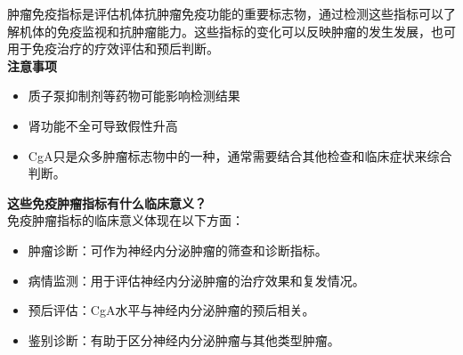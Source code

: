 \documentclass[UTF8]{ctexart}
\begin{document}
\vspace{0.05cm}

\begin{tcolorbox}[
    enhanced,
    colback=customTealBg,
    colframe=customTealBg,
    arc=3mm,
    boxrule=0pt,
    width=\textwidth,
    top=8pt,
    bottom=8pt
]
{\small{\color{customTeal}\faInfoCircle} 肿瘤免疫指标是评估机体抗肿瘤免疫功能的重要标志物，通过检测这些指标可以了解机体的免疫监视和抗肿瘤能力。这些指标的变化可以反映肿瘤的发生发展，也可用于免疫治疗的疗效评估和预后判断。\\

{\color{orange}\faExclamationTriangle} \textbf{注意事项}
\begin{itemize}[]
\item 质子泵抑制剂等药物可能影响检测结果
\item 肾功能不全可导致假性升高
\item CgA只是众多肿瘤标志物中的一种，通常需要结合其他检查和临床症状来综合判断。
\end{itemize}
}
\end{tcolorbox}

\begin{tcolorbox}[
    enhanced,
    colback=lightpurple!10, %
    colframe=white,  %
    arc=3mm,
    boxrule=0.5pt,
    width=\textwidth,
    top=8pt,
    bottom=8pt
]
{\small{\color{lightpurple}\faQuestionCircle}\quad \textbf{这些免疫肿瘤指标有什么临床意义？}\\
{\color{orange!50}\faComments}\quad 免疫肿瘤指标的临床意义体现在以下方面：
\begin{itemize}
    \item 肿瘤诊断：可作为神经内分泌肿瘤的筛查和诊断指标。
    \item 病情监测：用于评估神经内分泌肿瘤的治疗效果和复发情况。
    \item 预后评估：CgA水平与神经内分泌肿瘤的预后相关。
    \item 鉴别诊断：有助于区分神经内分泌肿瘤与其他类型肿瘤。
\end{itemize}
}
\end{tcolorbox}
\end{document}
